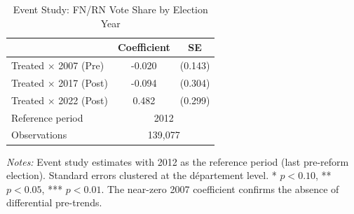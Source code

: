 \begin{table}[H]
\centering
\caption{Event Study: FN/RN Vote Share by Election Year}
\label{tab:event}
\begin{threeparttable}
\begin{tabular}{lcc}
\toprule
 & Coefficient & SE \\
\midrule
Treated $\times$ 2007 (Pre) & -0.020 & (0.143) \\
Treated $\times$ 2017 (Post) & -0.094 & (0.304) \\
Treated $\times$ 2022 (Post) & 0.482 & (0.299) \\
\midrule
Reference period & \multicolumn{2}{c}{2012} \\
Observations & \multicolumn{2}{c}{139,077} \\
\bottomrule
\end{tabular}
\begin{tablenotes}[flushleft]
\small
\item \textit{Notes:} Event study estimates with 2012 as the reference period (last pre-reform  election). Standard errors clustered at the d\'epartement level.  * $p<0.10$, ** $p<0.05$, *** $p<0.01$.  The near-zero 2007 coefficient confirms the absence of differential pre-trends.
\end{tablenotes}
\end{threeparttable}
\end{table}
